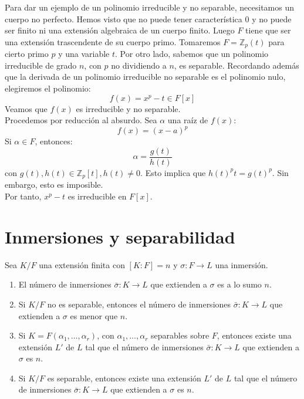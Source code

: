 \begin{example}
    Para dar un ejemplo de un polinomio irreducible y no separable, necesitamos un cuerpo no perfecto.
    Hemos visto que no puede tener característica 0 y no puede ser finito ni una extensión algebraica de un cuerpo finito.
    Luego $F$ tiene que ser una extensión trascendente de su cuerpo primo.
    Tomaremos $F = \mathbb{Z}_p(t)$ para cierto primo $p$ y una variable $t$.
    Por otro lado, sabemos que un polinomio irreducible de grado $n$, con $p$ no dividiendo a $n$, es separable.
    Recordando además que la derivada de un polinomio irreducible no separable es el polinomio nulo, elegiremos el polinomio:
    $$f(x) = x^p - t \in F[x]$$
    Veamos que $f(x)$ es irreducible y no separable.\\
    Procedemos por reducción al absurdo. Sea $\alpha$ una raíz de $f(x)$:
    $$f(x) = (x-a)^p$$
    Si $\alpha \in F$, entonces:
    $$\alpha = \frac{g(t)}{h(t)}$$
    con $g(t), h(t) \in \mathbb{Z}_p[t], h(t) \neq 0$.
    Esto implica que $h(t)^pt = g(t)^p$. Sin embargo, esto es imposible.\\
    Por tanto, $x^p - t$ es irreducible en $F[x]$.
\end{example}

\section{Inmersiones y separabilidad}

\begin{theorem}
    Sea $K/F$ una extensión finita con $[K : F] = n$ y $\sigma : F \to L$ una inmersión.
    \begin{enumerate}
        \item El número de inmersiones $\bar{\sigma} : K \to L$ que extienden a $\sigma$ es a lo sumo $n$.
        \item Si $K/F$ no es separable, entonces el número de inmersiones $\bar{\sigma} : K \to L$ que extienden a $\sigma$ es menor que $n$.
        \item Si $K = F(\alpha_1, \dots, \alpha_r)$, con $\alpha_1, \dots, \alpha_r$ separables sobre $F$, entonces existe una extensión $L'$ de $L$ tal que el número de inmersiones $\bar{\sigma} : K \to L$ que extienden a $\sigma$ es $n$.
        \item Si $K/F$ es separable, entonces existe una extensión $L'$ de $L$ tal que el número de inmersiones $\bar{\sigma} : K \to L$ que extienden a $\sigma$ es $n$.
    \end{enumerate}
\end{theorem}

